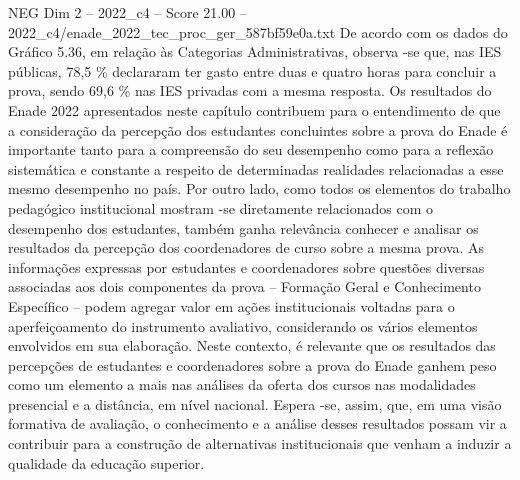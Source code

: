 \begin{textsample}{NEG Dim 2 – 2022\_c4 – Score 21.00 – 2022\_c4/enade\_2022\_tec\_proc\_ger\_587bf59e0a.txt}
De acordo com os dados do Gráfico 5.36, em relação às Categorias Administrativas, observa -se que, nas IES públicas, 78,5 \% declararam ter gasto entre duas e quatro horas para concluir a prova, sendo 69,6 \% nas IES privadas com a mesma resposta.
Os resultados do Enade 2022 apresentados neste capítulo contribuem para o entendimento de que a consideração da percepção dos estudantes concluintes sobre a prova do Enade é importante tanto para a compreensão do seu desempenho como para a reflexão sistemática e constante a respeito de determinadas realidades relacionadas a esse mesmo desempenho no país.
Por outro lado, como todos os elementos do trabalho pedagógico institucional mostram -se diretamente relacionados com o desempenho dos estudantes, também ganha relevância conhecer e analisar os resultados da percepção dos coordenadores de curso sobre a mesma prova.
As informações expressas por estudantes e coordenadores sobre questões diversas associadas aos dois componentes da prova – Formação Geral e Conhecimento Específico – podem agregar valor em ações institucionais voltadas para o aperfeiçoamento do instrumento avaliativo, considerando os vários elementos envolvidos em sua elaboração.
Neste contexto, é relevante que os resultados das percepções de estudantes e coordenadores sobre a prova do Enade ganhem peso como um elemento a mais nas análises da oferta dos cursos nas modalidades presencial e a distância, em nível nacional.
Espera -se, assim, que, em uma visão formativa de avaliação, o conhecimento e a análise desses resultados possam vir a contribuir para a construção de alternativas institucionais que venham a induzir a qualidade da educação superior.

\end{textsample}
